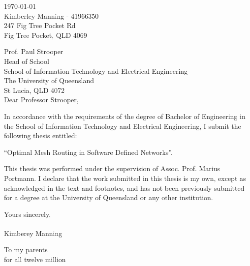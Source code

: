 \begin{flushright}
        \today\\
        Kimberley Manning - 41966350\\
        247 Fig Tree Pocket Rd\\
        Fig Tree Pocket, QLD 4069\\
        \medskip

\end{flushright}
\begin{flushleft}
  Prof. Paul Strooper\\
  Head of School\\
  School of Information Technology and Electrical Engineering\\
  The University of Queensland\\
  St Lucia, QLD 4072\\
  \bigskip\bigskip
  Dear Professor Strooper,\\
\end{flushleft}
In accordance with the requirements of the degree of Bachelor of Engineering in the School of Information Technology and Electrical Engineering, I submit the following thesis entitled:
\begin{center}
        ``Optimal Mesh Routing in Software Defined Networks''.\\
\end{center}
This thesis was performed under the supervision of Assoc. Prof. Marius Portmann. I declare that the work submitted in this thesis is my own, except as acknowledged in the text and footnotes, and has not been previously submitted for a degree at the University of Queensland or any other institution.



\begin{flushleft}
        \medskip
        Yours sincerely,\\
        \bigskip
        \emph\\
        \bigskip
    Kimberey Manning
\end{flushleft}

\cleardoublepage
\vspace*{70mm}
\begin{center}
\renewcommand{\baselinestretch}{1.0}
\sl


         To my parents \\
		for all twelve million


\end{center}

